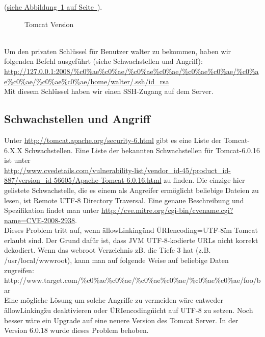 \documentclass[12pt,a4paper,titlepage,oneside]{scrartcl}
\begin{document}
(\hyperref[fig:image2]{siehe Abbildung~\ref*{fig:image2} auf Seite~\pageref*{fig:image2}}).
\begin{figure}[h!]
  \centering
  \caption{Tomcat Version}
  \label{fig:image2}
\end{figure}
\\
Um den privaten Schlüssel für Benutzer walter zu bekommen, haben wir folgenden Befehl ausgeführt (siehe Schwachstellen und Angriff): \\\url{http://127.0.0.1:2008/\%c0\%ae\%c0\%ae/\%c0\%ae\%c0\%ae/\%c0\%ae\%c0\%ae/\%c0\%ae\%c0\%ae/\%c0\%ae\%c0\%ae/home/walter/.ssh/id_rsa}
\\Mit diesem Schlüssel haben wir einen SSH-Zugang auf dem Server.

\subsection{Schwachstellen und Angriff}
Unter \url{http://tomcat.apache.org/security-6.html} gibt es eine Liste der Tomcat-6.X.X Schwachstellen. Eine Liste der bekannten Schwachstellen für Tomcat-6.0.16 ist unter \\ \url{http://www.cvedetails.com/vulnerability-list/vendor_id-45/product_id-887/version_id-56605/Apache-Tomcat-6.0.16.html} zu finden. Die einzige hier gelistete Schwachstelle, die es einem als Angreifer ermöglicht beliebige Dateien zu lesen, ist Remote UTF-8 Directory Traversal. Eine genaue Beschreibung und Spezifikation findet man unter \url{http://cve.mitre.org/cgi-bin/cvename.cgi?name=CVE-2008-2938}. \\ 
Dieses Problem tritt auf, wenn \"allowLinking\" und \"URIencoding=UTF-8\" im Tomcat erlaubt sind. Der Grund dafür ist, dass JVM UTF-8-kodierte URLs nicht korrekt dekodiert. Wenn das webroot Verzeichnis zB. die Tiefe 3 hat (z.B. /usr/local/wwwroot), kann man auf folgende Weise auf beliebige Daten zugreifen: \\ http://www.target.com/\%c0\%ae\%c0\%ae/\%c0\%ae\%c0\%ae/\%c0\%ae\%c0\%ae/foo/bar   \\Eine mögliche Lösung um solche Angriffe zu vermeiden wäre entweder \"allowLinking\" zu deaktivieren oder \"URIencoding\" nicht auf UTF-8 zu setzen. Noch besser wäre ein Upgrade auf eine neuere Version des Tomcat Server. In der Version 6.0.18 wurde dieses Problem behoben. 
\end{document}

